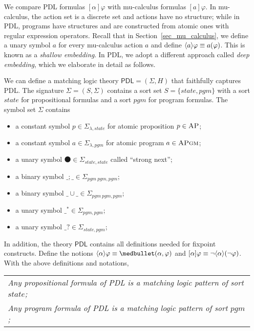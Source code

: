 \documentclass[acmsmall,review,anonymous]{acmart}
\newcommand{\sig}{\mathbb{\Sigma}}
\newcommand{\MLPDL}{\mathsf{PDL}}
\newcommand{\AP}{\textsc{AP}}
\newcommand{\APgm}{\textsc{APgm}}
\newcommand{\snext}{{\medbullet}}
\newcommand{\statesort}{\mathit{state}}
\newcommand{\pgm}{\mathit{pgm}}
\DeclarePairedDelimiter{\angleBraces}{\langle}{\rangle}
\newcommand{\PDLseq}{\mathbin{;}}
\newcommand{\PDLunion}{\mathbin{\cup}}
\newcommand{\PDLstar}{^*}
\newcommand{\PDLquestion}{{?}}
\begin{document}
We compare PDL formulas $[\alpha] \varphi$
with mu-calculus formulas $[a]\varphi$.
In mu-calculus, the action set is a discrete set and actions have no structure;
while in PDL, programs have structures and are constructed from atomic ones with
regular expression operators.
Recall that in Section~\ref{sec_mu_calculus},
we define a unary symbol $a$ for every mu-calculus action $a$ and
define $\angleBraces{a} \varphi \equiv a(\varphi)$.
This is known as a \emph{shallow embedding}.
In PDL, we adopt a different approach called \emph{deep embedding},
which we elaborate in detail as follows.

We can define a matching logic theory $\MLPDL = (\sig, H)$ that
faithfully captures PDL.
The signature $\sig = (S,\Sigma)$ contains
a sort set $S = \{ \statesort , \pgm \}$ with
a sort $\statesort$ for propositional formulas and
a sort $\pgm$ for program formulas.
The symbol set $\Sigma$ contains
\begin{itemize}
\item a constant symbol $p \in \Sigma_{\lambda,\statesort}$
      for atomic proposition $p \in \AP$;
\item a constant symbol $a \in \Sigma_{\lambda,\pgm}$
      for atomic program $a \in \APgm$;
\item a unary symbol $\snext \in \Sigma_{\statesort,\statesort}$ called ``strong next'';
\item a binary symbol $\_\PDLseq\_ \in \Sigma_{\pgm \ \pgm , \pgm}$;
\item a binary symbol $\_ \PDLunion \_ \in \Sigma_{\pgm \ \pgm , \pgm}$;
\item a unary symbol $\_ \PDLstar \in \Sigma_{\pgm , \pgm}$;
\item a unary symbol $\_ \PDLquestion \in \Sigma_{\statesort, \pgm}$;
\end{itemize}
In addition, the theory $\MLPDL$ contains all definitions needed for fixpoint constructs.
Define the notions
$\angleBraces{\alpha} \varphi \equiv \snext(\alpha,\varphi)$
and $[\alpha] \varphi \equiv \neg \angleBraces{\alpha} (\neg \varphi)$.
With the above definitions and notations,
\begin{center}
\begin{tabular}{l}
\em
Any propositional formula of PDL is a matching logic pattern of sort $\statesort$;
\\
\em
Any program formula of PDL is a matching logic pattern of sort $\pgm$;
\end{tabular}
\end{center}
\end{document}
